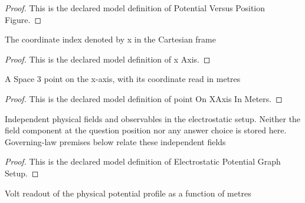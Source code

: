 \begin{proof}
  This is the declared model definition of Potential Versus Position Figure.
\end{proof}
\begin{definition}[x Axis]
  \label{def:physics:phyx-mini-0875:phyxminiproblems-problemphyxmini0875-xaxis}
  The coordinate index denoted by x in the Cartesian frame
\end{definition}
\begin{proof}
  This is the declared model definition of x Axis.
\end{proof}
\begin{definition}
  \label{def:physics:phyx-mini-0875:phyxminiproblems-problemphyxmini0875-pointonxaxisinmeters}
  A Space 3 point on the x-axis, with its coordinate read in metres
\end{definition}
\begin{proof}
  This is the declared model definition of point On XAxis In Meters.
\end{proof}
\begin{definition}
  \label{def:physics:phyx-mini-0875:phyxminiproblems-problemphyxmini0875-electrostaticpotentialgraphsetup}
  Independent physical fields and observables in the electrostatic setup. Neither the field component at the question position nor any answer choice is stored here. Governing-law premises below relate these independent fields
\end{definition}
\begin{proof}
  This is the declared model definition of Electrostatic Potential Graph Setup.
\end{proof}
\begin{definition}
  \label{def:physics:phyx-mini-0875:phyxminiproblems-problemphyxmini0875-potentialprofileinvolts}
  Volt readout of the physical potential profile as a function of metres
\end{definition}
